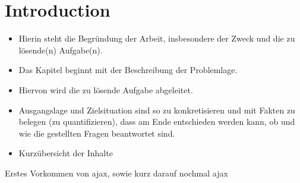 
\chapter{Introduction}
\label{chap:introduction}

\begin{itemize}
  \item Hierin steht die Begründung der Arbeit, insbesondere der Zweck und die zu lösende(n) Aufgabe(n).
  \item Das Kapitel beginnt mit der Beschreibung der Problemlage.
  \item Hiervon wird die zu lösende Aufgabe abgeleitet.
  \item Ausgangslage und Zielsituation sind so zu konkretisieren und mit Fakten zu belegen (zu quantifizieren), dass am Ende entschieden werden kann, ob und wie die gestellten Fragen beantwortet sind.
  \item Kurzübersicht der Inhalte
\end{itemize}

Erstes Vorkommen von \ac{ajax}, sowie kurz darauf nochmal \ac{ajax}